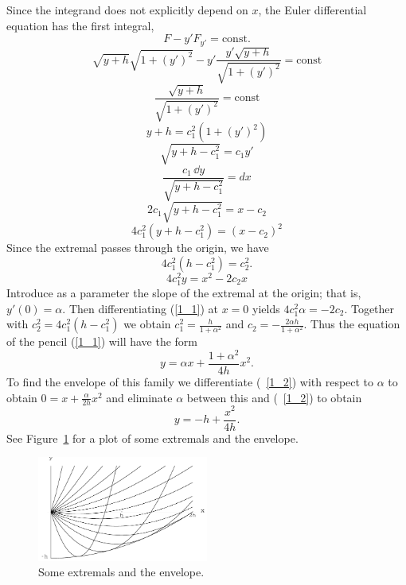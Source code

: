 \begin{Solution}
  Since the integrand does not explicitly depend on $x$, the Euler differential
  equation has the first integral,
  \[
  F - y' F_{y'} = \mathrm{const}.
  \]
  \[
  \sqrt{y+h} \sqrt{1+(y')^2} - y' \frac{y' \sqrt{y+h}}{\sqrt{1+(y')^2}}
  = \mathrm{const}
  \]
  \[
  \frac{\sqrt{y+h}}{\sqrt{1+(y')^2}} = \mathrm{const}
  \]
  \[
  y + h = c_1^2 (1 + (y')^2)
  \]
  \[
  \sqrt{ y + h - c_1^2 } = c_1 y'
  \]
  \[
  \frac{ c_1 \,\dd y }{ \sqrt{ y + h - c_1^2 } } = d x
  \]
  \[
  2 c_1 \sqrt{ y + h - c_1^2 } = x - c_2
  \]
  \[
  4 c_1^2 ( y + h - c_1^2 ) = (x - c_2)^2
  \]
  Since the extremal passes through the origin, we have
  \[
  4 c_1^2 ( h - c_1^2 ) = c_2^2.
  \]
  \begin{equation}
    \label{1_1}
    4 c_1^2  y  = x^2 - 2 c_2 x
  \end{equation}
  Introduce as a parameter the slope of the extremal at the origin; that is,
  $y'(0) = \alpha$.  Then differentiating (\ref{1_1}) at $x = 0$ yields
  $4 c_1^2 \alpha = - 2 c_2$.  Together with $c_2^2 = 4 c_1^2 (h - c_1^2)$
  we obtain $c_1^2 = \frac{h}{1+\alpha^2}$ and 
  $c_2 = - \frac{2 \alpha h}{1 + \alpha^2}$.
  Thus the equation of the pencil (\ref{1_1}) will have the form
  \begin{equation}
    \label{1_2}
    y = \alpha x + \frac{1 + \alpha^2}{4 h} x^2.
  \end{equation}
  To find the envelope of this family we differentiate (~\ref{1_2}) with
  respect to $\alpha$ to obtain $0 = x + \frac{\alpha}{2h} x^2$ and
  eliminate $\alpha$ between this and (~\ref{1_2}) to obtain
  \[
  y = -h + \frac{x^2}{4h}.
  \]
  See Figure~\ref{parasafe} for a plot of some extremals and the envelope.


  \begin{figure}[h!]
    \begin{center}
      \includegraphics[width=0.5\textwidth]{cv/cv/parasafe}
    \end{center}
    \caption{Some extremals and the envelope.}
    \label{parasafe}
  \end{figure}



\end{Solution}
